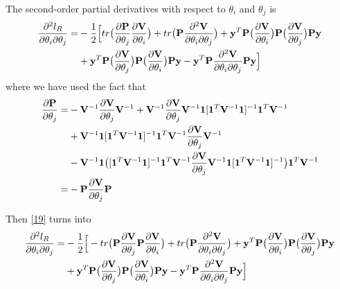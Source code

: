 \documentclass[11pt]{article}
\begin{document}
The second-order partial derivatives with respect to $\theta_i$ and $\theta_j$ is 
\begin{align}
\frac{\partial^2 l_R}{\partial \theta_i \partial \theta_j}=&-\frac{1}{2}\Big[tr\big(\frac{\partial {\bf P}}{\partial \theta_j} \frac{\partial {\bf V}}{\partial \theta_i}\big)+tr\big({\bf P} \frac{\partial^2 {\bf V}}{\partial \theta_i \partial \theta_j}\big)+{\bf y}^T {\bf P}\big(\frac{\partial {\bf V}}{\partial \theta_i}\big){\bf P} \big(\frac{\partial {\bf V}}{\partial \theta_j}\big){\bf P} {\bf y} \nonumber\\
&+{\bf y}^T {\bf P}\big(\frac{\partial {\bf V}}{\partial \theta_j}\big){\bf P} \big(\frac{\partial {\bf V}}{\partial \theta_i}\big){\bf P} {\bf y}-{\bf y}^T {\bf P}\frac{\partial^2 {\bf V}}{\partial \theta_i \partial \theta_j}{\bf P} {\bf y} \Big] \label{19}
\end{align}
where we have used the fact that
\begin{align*}
\frac{\partial {\bf P}}{\partial \theta_j}=&-{\bf V}^{-1}\frac{\partial {\bf V}}{\partial \theta_j}{\bf V}^{-1}+{\bf V}^{-1}\frac{\partial {\bf V}}{\partial \theta_j}{\bf V}^{-1}\mathbf{1}[\mathbf{1}^T{\bf V}^{-1}\mathbf{1}]^{-1}\mathbf{1}^T{\bf V}^{-1}\\
&+{\bf V}^{-1}\mathbf{1}[\mathbf{1}^T{\bf V}^{-1}\mathbf{1}]^{-1}\mathbf{1}^T{\bf V}^{-1}\frac{\partial {\bf V}}{\partial \theta_j}{\bf V}^{-1}\\&-{\bf V}^{-1}\mathbf{1}\big([\mathbf{1}^T{\bf V}^{-1}\mathbf{1}]^{-1}\mathbf{1}^T{\bf V}^{-1}\frac{\partial {\bf V}}{\partial \theta_j}{\bf V}^{-1}\mathbf{1}[\mathbf{1}^T{\bf V}^{-1}\mathbf{1}]^{-1}\big)\mathbf{1}^T{\bf V}^{-1}\\
=&-{\bf P}\frac{\partial {\bf V}}{\partial \theta_j}{\bf P}
\end{align*}

Then \eqref{19} turns into 
\begin{align}
\frac{\partial^2 l_R}{\partial \theta_i \partial \theta_j}=&-\frac{1}{2}\Big[-tr\big({\bf P} \frac{\partial {\bf V}}{\partial \theta_j}{\bf P} \frac{\partial {\bf V}}{\partial \theta_i}\big)+tr\big({\bf P} \frac{\partial^2 {\bf V}}{\partial \theta_i \partial \theta_j}\big)+{\bf y}^T {\bf P}\big(\frac{\partial {\bf V}}{\partial \theta_i}\big){\bf P} \big(\frac{\partial {\bf V}}{\partial \theta_j}\big){\bf P} {\bf y} \nonumber\\
&+{\bf y}^T {\bf P}\big(\frac{\partial {\bf V}}{\partial \theta_j}\big){\bf P} \big(\frac{\partial {\bf V}}{\partial \theta_i}\big){\bf P} {\bf y}-{\bf y}^T {\bf P}\frac{\partial^2 {\bf V}}{\partial \theta_i \partial \theta_j}{\bf P} {\bf y} \Big] \label{19}
\end{align}
\end{document}
